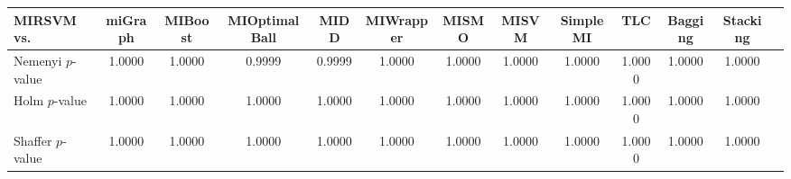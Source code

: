 \begin{threeparttable}
\begin{tabular}{lcccccccccccc}
\toprule
MIRSVM vs. &miGraph &MIBoost &MIOptimalBall &MIDD &MIWrapper &MISMO &MISVM &SimpleMI &TLC &Bagging &Stacking \\
\midrule
Nemenyi $p$-value &1.0000 &1.0000 &0.9999 &0.9999 &1.0000 &1.0000 &1.0000 &1.0000 &1.0000 &1.0000 &1.0000 &  \\
Holm $p$-value &1.0000 &1.0000 &1.0000 &1.0000 &1.0000 &1.0000 &1.0000 &1.0000 &1.0000 &1.0000 &1.0000 &  \\
Shaffer $p$-value &1.0000 &1.0000 &1.0000 &1.0000 &1.0000 &1.0000 &1.0000 &1.0000 &1.0000 &1.0000 &1.0000 &  \\
\bottomrule
\end{tabular}
\end{threeparttable}